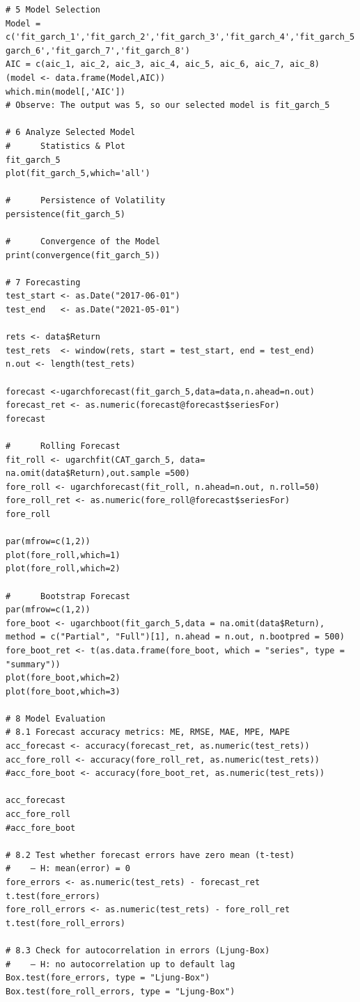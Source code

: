 \documentclass{article}
\begin{document}
\begin{verbatim}
# 5 Model Selection
Model = c('fit_garch_1','fit_garch_2','fit_garch_3','fit_garch_4','fit_garch_5','fit_
garch_6','fit_garch_7','fit_garch_8')
AIC = c(aic_1, aic_2, aic_3, aic_4, aic_5, aic_6, aic_7, aic_8)
(model <- data.frame(Model,AIC))
which.min(model[,'AIC'])
# Observe: The output was 5, so our selected model is fit_garch_5

# 6 Analyze Selected Model
#      Statistics & Plot
fit_garch_5
plot(fit_garch_5,which='all')   

#      Persistence of Volatility
persistence(fit_garch_5) 

#      Convergence of the Model
print(convergence(fit_garch_5))

# 7 Forecasting
test_start <- as.Date("2017-06-01")
test_end   <- as.Date("2021-05-01")

rets <- data$Return
test_rets  <- window(rets, start = test_start, end = test_end)
n.out <- length(test_rets)

forecast <-ugarchforecast(fit_garch_5,data=data,n.ahead=n.out)
forecast_ret <- as.numeric(forecast@forecast$seriesFor)
forecast

#      Rolling Forecast 
fit_roll <- ugarchfit(CAT_garch_5, data= na.omit(data$Return),out.sample =500)
fore_roll <- ugarchforecast(fit_roll, n.ahead=n.out, n.roll=50)
fore_roll_ret <- as.numeric(fore_roll@forecast$seriesFor)
fore_roll

par(mfrow=c(1,2))
plot(fore_roll,which=1)
plot(fore_roll,which=2)

#      Bootstrap Forecast
par(mfrow=c(1,2))
fore_boot <- ugarchboot(fit_garch_5,data = na.omit(data$Return), method = c("Partial", "Full")[1], n.ahead = n.out, n.bootpred = 500)
fore_boot_ret <- t(as.data.frame(fore_boot, which = "series", type = "summary"))
plot(fore_boot,which=2)
plot(fore_boot,which=3)

# 8 Model Evaluation
# 8.1 Forecast accuracy metrics: ME, RMSE, MAE, MPE, MAPE
acc_forecast <- accuracy(forecast_ret, as.numeric(test_rets))
acc_fore_roll <- accuracy(fore_roll_ret, as.numeric(test_rets))
#acc_fore_boot <- accuracy(fore_boot_ret, as.numeric(test_rets))

acc_forecast
acc_fore_roll
#acc_fore_boot

# 8.2 Test whether forecast errors have zero mean (t‑test)
#    – H: mean(error) = 0
fore_errors <- as.numeric(test_rets) - forecast_ret
t.test(fore_errors)
fore_roll_errors <- as.numeric(test_rets) - fore_roll_ret
t.test(fore_roll_errors)

# 8.3 Check for autocorrelation in errors (Ljung‑Box)
#    – H: no autocorrelation up to default lag
Box.test(fore_errors, type = "Ljung-Box")
Box.test(fore_roll_errors, type = "Ljung-Box")
\end{verbatim}
\end{document}
